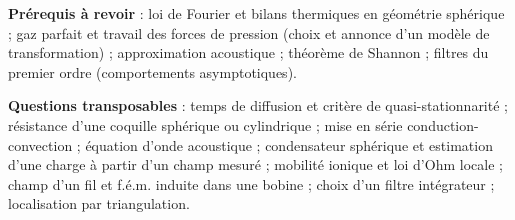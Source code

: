 \documentclass[11pt,a4paper]{article}
\begin{document}
\textbf{Prérequis à revoir} : loi de Fourier et bilans thermiques en géométrie sphérique ; gaz parfait et travail des forces de pression (choix et annonce d'un modèle de transformation) ; approximation acoustique ; théorème de Shannon ; filtres du premier ordre (comportements asymptotiques).

\textbf{Questions transposables} : temps de diffusion et critère de quasi-stationnarité ; résistance d'une coquille sphérique ou cylindrique ; mise en série conduction-convection ; équation d'onde acoustique ; condensateur sphérique et estimation d'une charge à partir d'un champ mesuré ; mobilité ionique et loi d'Ohm locale ; champ d'un fil et f.é.m. induite dans une bobine ; choix d'un filtre intégrateur ; localisation par triangulation.
\end{document}
